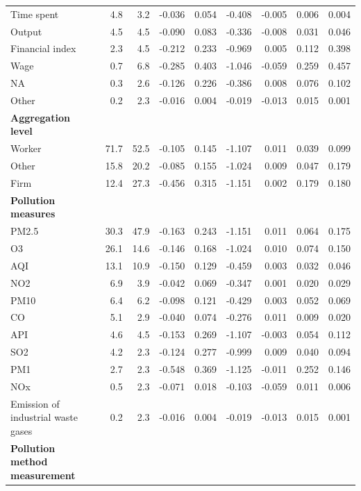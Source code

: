 \documentclass[
]{article}
\begin{document}
\begin{table}[t]
\begin{tabular*}{\linewidth}{@{\extracolsep{\fill}}l|rrrrrrrr}
   Time spent & 4.8 & 3.2 & {-0.036} & 0.054 & -0.408 & -0.005 & 0.006 & 0.004 \\ 
   Output & 4.5 & 4.5 & {-0.090} & 0.083 & -0.336 & -0.008 & 0.031 & 0.046 \\ 
   Financial index & 2.3 & 4.5 & {-0.212} & 0.233 & -0.969 & 0.005 & 0.112 & 0.398 \\ 
   Wage & 0.7 & 6.8 & {-0.285} & 0.403 & -1.046 & -0.059 & 0.259 & 0.457 \\ 
   NA & 0.3 & 2.6 & {-0.126} & 0.226 & -0.386 & 0.008 & 0.076 & 0.102 \\ 
   Other & 0.2 & 2.3 & {-0.016} & 0.004 & -0.019 & -0.013 & 0.015 & 0.001 \\ 
{\bfseries Aggregation level} &  &  & {} &  &  &  &  &  \\ 
   Worker & 71.7 & 52.5 & {-0.105} & 0.145 & -1.107 & 0.011 & 0.039 & 0.099 \\ 
   Other & 15.8 & 20.2 & {-0.085} & 0.155 & -1.024 & 0.009 & 0.047 & 0.179 \\ 
   Firm & 12.4 & 27.3 & {-0.456} & 0.315 & -1.151 & 0.002 & 0.179 & 0.180 \\ 
{\bfseries Pollution measures} &  &  & {} &  &  &  &  &  \\ 
   PM2.5 & 30.3 & 47.9 & {-0.163} & 0.243 & -1.151 & 0.011 & 0.064 & 0.175 \\ 
   O3 & 26.1 & 14.6 & {-0.146} & 0.168 & -1.024 & 0.010 & 0.074 & 0.150 \\ 
   AQI & 13.1 & 10.9 & {-0.150} & 0.129 & -0.459 & 0.003 & 0.032 & 0.046 \\ 
   NO2 & 6.9 & 3.9 & {-0.042} & 0.069 & -0.347 & 0.001 & 0.020 & 0.029 \\ 
   PM10 & 6.4 & 6.2 & {-0.098} & 0.121 & -0.429 & 0.003 & 0.052 & 0.069 \\ 
   CO & 5.1 & 2.9 & {-0.040} & 0.074 & -0.276 & 0.011 & 0.009 & 0.020 \\ 
   API & 4.6 & 4.5 & {-0.153} & 0.269 & -1.107 & -0.003 & 0.054 & 0.112 \\ 
   SO2 & 4.2 & 2.3 & {-0.124} & 0.277 & -0.999 & 0.009 & 0.040 & 0.094 \\ 
   PM1 & 2.7 & 2.3 & {-0.548} & 0.369 & -1.125 & -0.011 & 0.252 & 0.146 \\ 
   NOx & 0.5 & 2.3 & {-0.071} & 0.018 & -0.103 & -0.059 & 0.011 & 0.006 \\ 
   Emission of industrial waste gases & 0.2 & 2.3 & {-0.016} & 0.004 & -0.019 & -0.013 & 0.015 & 0.001 \\ 
{\bfseries Pollution method measurement} &  &  & {} &  &  &  &  &  \\ 

\end{tabular*}
\end{table}
\end{document}
